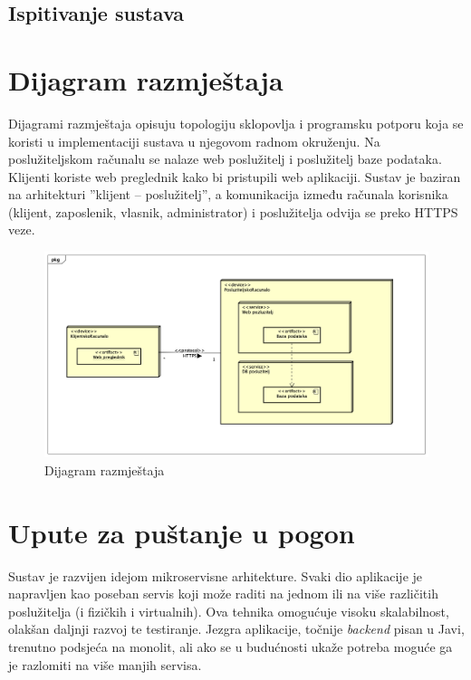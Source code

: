 			
			\subsection{Ispitivanje sustava}
			
			\eject 
		
		
		\section{Dijagram razmještaja}
			
			Dijagrami razmještaja opisuju topologiju sklopovlja i programsku potporu koja se koristi u implementaciji sustava u njegovom radnom okruženju. Na poslužiteljskom računalu se nalaze web poslužitelj i poslužitelj baze podataka. Klijenti koriste web preglednik kako bi pristupili web aplikaciji. Sustav je baziran na arhitekturi ”klijent – poslužitelj”, a komunikacija između računala korisnika (klijent, zaposlenik, vlasnik, administrator) i poslužitelja odvija se preko HTTPS veze.
			
			\begin{figure}[H]
					\includegraphics[scale=0.4]{figures/Deployment Diagram0.PNG}
					\centering
					\caption{Dijagram razmještaja}
					\label{fig:Dijagram razmještaja}
				\end{figure}
			\eject 
		
		\section{Upute za puštanje u pogon}
		
	
		
		Sustav je razvijen idejom mikroservisne arhitekture. Svaki dio aplikacije je napravljen kao poseban servis koji može raditi na jednom ili na više različitih poslužitelja (i fizičkih i virtualnih). Ova tehnika omogućuje visoku skalabilnost, olakšan daljnji razvoj te testiranje. Jezgra aplikacije, točnije  \textit{backend} pisan u Javi, trenutno podsjeća na monolit, ali ako se u budućnosti ukaže potreba moguće ga je razlomiti na više manjih servisa. 

